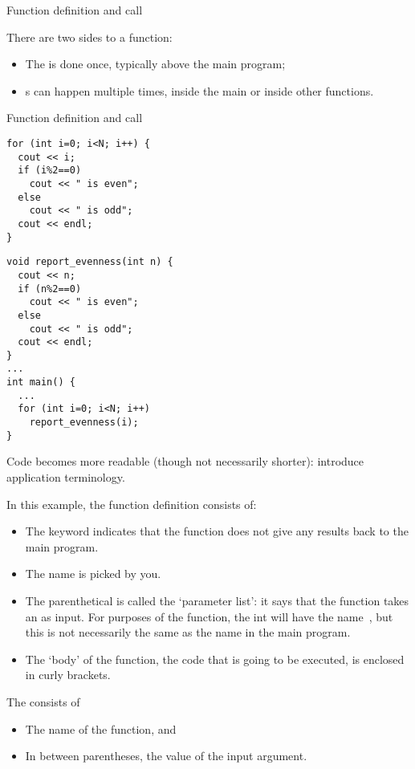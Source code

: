  {Function definition and call}

There are two sides to a function:
\begin{itemize}
\item
  The  is done once, typically
  above the main program;
\item {}s can happen multiple times, inside
  the main or inside other functions.
\end{itemize}

\begin{block}{Function definition and call}
  \label{sl:def-call}
  \begin{multicols}{2}
\begin{verbatim}
for (int i=0; i<N; i++) {
  cout << i;
  if (i%2==0)
    cout << " is even";
  else
    cout << " is odd";
  cout << endl;
}
\end{verbatim}
\columnbreak
\begin{verbatim}
void report_evenness(int n) {
  cout << n;
  if (n%2==0)
    cout << " is even";
  else
    cout << " is odd";
  cout << endl;
}
...
int main() {
  ...
  for (int i=0; i<N; i++)
    report_evenness(i);
}
\end{verbatim}
  \end{multicols}
Code becomes more readable (though not necessarily shorter): introduce
application terminology.
\end{block}

In this example, the function definition consists of:
\begin{itemize}
\item The keyword  indicates that the function does
  not give any results back to the main program.
\item The name  is picked by you.
\item The parenthetical  is called the `parameter list': it
  says that the function takes an  as input. For purposes of
  the function, the int will have the name~, but this is not
  necessarily the same as the name in the main program.
\item The `body' of the function, the code that is going to be
  executed, is enclosed in curly brackets.
\end{itemize}

The  consists of
\begin{itemize}
\item The name of the function, and
\item In between parentheses, the value of the input argument.
\end{itemize}

